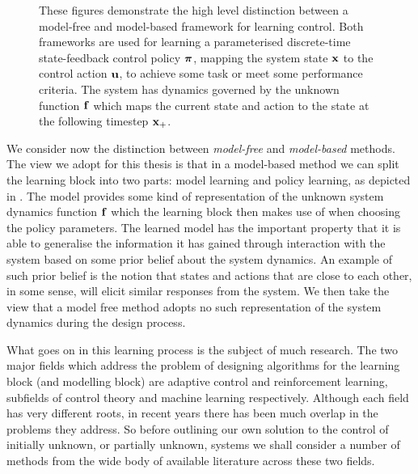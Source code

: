 \begin{figure}[]
\centering
{}
\caption{These figures demonstrate the high level distinction between a model-free and model-based framework for learning control. Both frameworks are used for learning a parameterised discrete-time state-feedback control policy $\boldsymbol{\pi}$, mapping the system state $\mathbf{x}$ to the control action $\mathbf{u}$, to achieve some task or meet some performance criteria. The system has dynamics governed by the unknown function $\mathbf{f}$ which maps the current state and action to the state at the following timestep $\mathbf{x}_+$.}
\end{figure}


We consider now the distinction between \textit{model-free} and \textit{model-based} methods. The view we adopt for this thesis is that in a model-based method we can split the learning block into two parts: model learning and policy learning, as depicted in . The model provides some kind of representation of the unknown system dynamics function $\mathbf{f}$ which the learning block then makes use of when choosing the policy parameters. The learned model has the important property that it is able to generalise the information it has gained through interaction with the system based on some prior belief about the system dynamics. An example of such prior belief is the notion that states and actions that are close to each other, in some sense, will elicit similar responses from the system. We then take the view that a model free method adopts no such representation of the system dynamics during the design process.



What goes on in this learning process is the subject of much research. The two major fields which address the problem of designing algorithms for the learning block (and modelling block) are adaptive control and reinforcement learning, subfields of control theory and machine learning respectively. Although each field has very different roots, in recent years there has been much overlap in the problems they address. So before outlining our own solution to the control of initially unknown, or partially unknown, systems we shall consider a number of methods from the wide body of available literature across these two fields.











